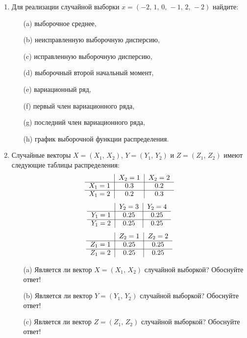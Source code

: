 \documentclass[12pt, a4paper]{article}\usepackage[]{graphicx}\usepackage[]{color}
\begin{document}
\begin{enumerate}
  \item  Для реализации случайной выборки $x = (-2, \, 1, \, 0, \, -1, \, 2, \, -2)$ найдите:
\begin{itemize}
  \item[(a)] выборочное среднее,
  \item[(b)] неисправленную выборочную дисперсию,
  \item[(c)] исправленную выборочную дисперсию,
  \item[(d)] выборочный второй начальный момент,
  \item[(e)] вариационный ряд,
  \item[(f)] первый член вариационного ряда,
  \item[(g)] последний член вариационного ряда,
  \item[(h)] график выборочной функции распределения.
\end{itemize}


\item
Случайные векторы $X = (X_1, \, X_2)$, $Y = (Y_1, \, Y_2)$ и $Z = (Z_1, \, Z_2)$ имеют следующие таблицы распределения:
\[
\begin{tabular}{c|c|c}
  {}        & $X_2=1$    & $X_2=2$   \\ \cline{1-3}
  $X_1=1$   & $0.3$       & $0.2$   \\ \cline{1-3}
  $X_1=2$   & $0.2$       & $0.3$   \\
\end{tabular}
\]
\[
\begin{tabular}{c|c|c}
  {}         & $Y_2=3$     & $Y_2=4$   \\ \cline{1-3}
  $Y_1=1$   & $0.25$       & $0.25$   \\ \cline{1-3}
  $Y_1=2$    & $0.25$      & $0.25$   \\
\end{tabular}
\]
\[
\begin{tabular}{c|c|c}
  {}         & $Z_2=1$     & $Z_2=2$   \\ \cline{1-3}
  $Z_1=1$   & $0.25$       & $0.25$   \\ \cline{1-3}
  $Z_1=2$    & $0.25$      & $0.25$   \\
\end{tabular}
\]
\begin{itemize}
  \item[(a)] Является ли вектор $X = (X_1, \, X_2)$ случайной выборкой? Обоснуйте ответ!
  \item[(b)] Является ли вектор $Y = (Y_1, \, Y_2)$ случайной выборкой? Обоснуйте ответ!
  \item[(c)] Является ли вектор $Z = (Z_1, \, Z_2)$ случайной выборкой? Обоснуйте ответ!
\end{itemize}


\end{enumerate}
\end{document}
